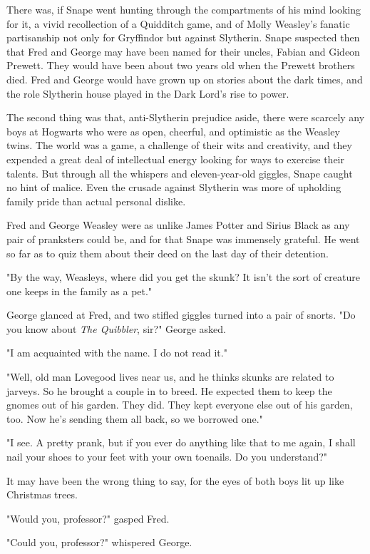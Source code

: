 \documentclass[a4paper,11pt]{article}
\begin{document}
There was, if Snape went hunting through the compartments of his mind looking for it, a vivid recollection of a Quidditch game, and of Molly Weasley's fanatic partisanship not only for Gryffindor but against Slytherin. Snape suspected then that Fred and George may have been named for their uncles, Fabian and Gideon Prewett. They would have been about two years old when the Prewett brothers died. Fred and George would have grown up on stories about the dark times, and the role Slytherin house played in the Dark Lord's rise to power.

The second thing was that, anti-Slytherin prejudice aside, there were scarcely any boys at Hogwarts who were as open, cheerful, and optimistic as the Weasley twins. The world was a game, a challenge of their wits and creativity, and they expended a great deal of intellectual energy looking for ways to exercise their talents. But through all the whispers and eleven-year-old giggles, Snape caught no hint of malice. Even the crusade against Slytherin was more of upholding family pride than actual personal dislike.

Fred and George Weasley were as unlike James Potter and Sirius Black as any pair of pranksters could be, and for that Snape was immensely grateful. He went so far as to quiz them about their deed on the last day of their detention.

"By the way, Weasleys, where did you get the skunk? It isn't the sort of creature one keeps in the family as a pet."

George glanced at Fred, and two stifled giggles turned into a pair of snorts. "Do you know about \emph{The Quibbler}, sir?" George asked.

"I am acquainted with the name. I do not read it."

"Well, old man Lovegood lives near us, and he thinks skunks are related to jarveys. So he brought a couple in to breed. He expected them to keep the gnomes out of his garden. They did. They kept everyone else out of his garden, too. Now he's sending them all back, so we borrowed one."

"I see. A pretty prank, but if you ever do anything like that to me again, I shall nail your shoes to your feet with your own toenails. Do you understand?"

It may have been the wrong thing to say, for the eyes of both boys lit up like Christmas trees.

"Would you, professor?" gasped Fred.

"Could you, professor?" whispered George.
\end{document}
